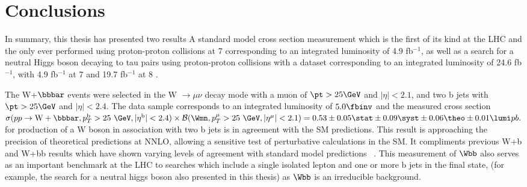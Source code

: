 \chapter{Conclusions}
%
%
%

In summary, this thesis has presented two results
A standard model cross section measurement 
which is the first of its kind at the LHC and the only
ever performed using proton-proton collisions at 7 \TeV corresponding to
an integrated luminosity of 4.9 fb$^{-1}$, as well as a search for 
a neutral Higgs boson decaying to tau pairs using proton-proton collisions
with a dataset corresponding to an integrated luminosity of 
24.6 fb$^{-1}$, with 4.9 fb$^{-1}$ at 7 \TeV and 19.7 fb$^{-1}$ at 8 \TeV. 

The W+$\bbbar$ events were selected in the W $\to \mu\nu$ decay mode with a 
muon of $\pt>25\GeV$ and $|\eta|<2.1$, and two b jets with $\pt>25\GeV$ and $|\eta|<2.4$. 
The data sample corresponds to an integrated luminosity of $5.0\fbinv$ and
the measured cross section 
$\sigma(pp\rightarrow \mathrm{W} + \bbbar, p_T^{\mathrm{b}}>25~\GeV, |\eta^{\mathrm{b}}|<2.4)\times {\cal{B}}(\Wmn, p_T^{\mu}>25~\GeV, |\eta^{\mu}|<2.1) =0.53\pm  0.05\stat \pm 0.09 \syst \pm 0.06 \theo \pm 0.01\lumi pb.$
for production of a W boson in association with two b jets is in agreement with
the SM predictions.
This result is approaching the precision of theoretical predictions at NNLO, 
allowing a sensitive test of perturbative calculations
in the SM. It compliments previous W+b and W+bb results which
have shown varying levels of agreement 
with standard model predictions ~\cite{Aaltonen:2009qi,D0:2012qt,Aad:2011kp}. 
This measurement of $\Wbb$ also serves as an important
benchmark at the LHC to 
searches which include a single isolated lepton and one or more b jets in the final state,
(for example, the search for a neutral higgs boson also presented in this thesis) 
as $\Wbb$ is an irreducible background. %

